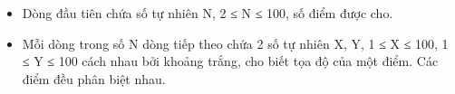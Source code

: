 \begin{itemize}
	\item     Dòng đầu tiên chứa số tự nhiên N, 2 ≤ N ≤ 100, số điểm được cho.   
	\item     Mỗi dòng trong số N dòng tiếp theo chứa 2 số tự nhiên X, Y, 1 ≤ X ≤ 100, 1 ≤ Y ≤ 100 cách nhau bởi khoảng trắng, cho biết tọa độ của một điểm. Các điểm đều phân biệt nhau.   
\end{itemize}

\